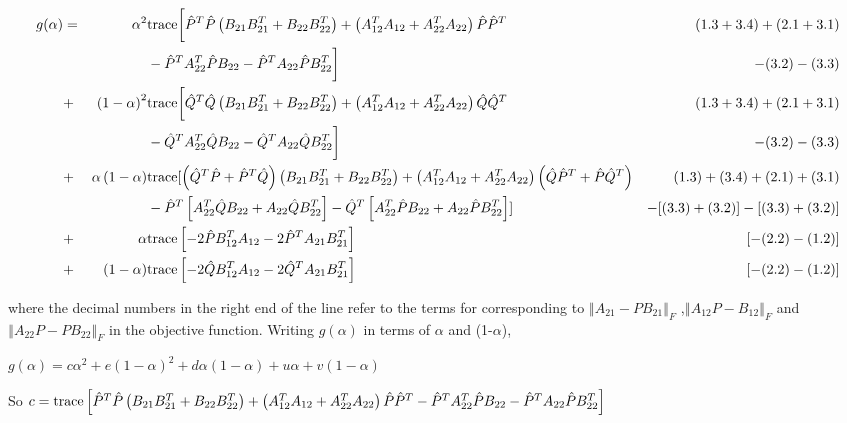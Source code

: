\documentclass[12pt,oneside,final]{thesis}\usepackage[]{graphicx}\usepackage[]{color}
\begin{document}
\begin{flushleft}
\begin{align*}
g(\alpha) & = & \alpha^{2} & \textup{trace}\biggl[\hat{P}^{T}\hat{P}\left(B_{21}B_{21}^{T}+B_{22}B_{22}^{T}\right)+\left(A_{12}^{T}A_{12}+A_{22}^{T}A_{22}\right)\hat{P}\hat{P}^{T} & (1.3+3.4)+(2.1+3.1)\\
 &  &  & -\hat{P}^{T}A_{22}^{T}\hat{P}B_{22}-\hat{P}^{T}A_{22}\hat{P}B_{22}^{T}\biggr] & -(3.2)-(3.3)\\
 & + & \left(1-\alpha\right)^{2} & \textup{trace}\biggl[\hat{Q}^{T}\hat{Q}\left(B_{21}B_{21}^{T}+B_{22}B_{22}^{T}\right)+\left(A_{12}^{T}A_{12}+A_{22}^{T}A_{22}\right)\hat{Q}\hat{Q}^{T} & (1.3+3.4)+(2.1+3.1)\\
 &  &  & -\hat{Q}^{T}A_{22}^{T}\hat{Q}B_{22}-\hat{Q}^{T}A_{22}\hat{Q}B_{22}^{T}\biggr] & -(3.2)-(3.3)\\
 & + & \alpha\left(1-\alpha\right) & \textup{trace}[\left(\hat{Q}^{T}\hat{P}+\hat{P}^{T}\hat{Q}\right)\left(B_{21}B_{21}^{T}+B_{22}B_{22}^{T}\right)+\left(A_{12}^{T}A_{12}+A_{22}^{T}A_{22}\right)\left(\hat{Q}\hat{P}^{T}+\hat{P}\hat{Q}^{T}\right) & (1.3)+(3.4)+(2.1)+(3.1)\\
 &  &  & -\hat{P}^{T}\left[A_{22}^{T}\hat{Q}B_{22}+A_{22}\hat{Q}B_{22}^{T}\right]-\hat{Q}^{T}\left[A_{22}^{T}\hat{P}B_{22}+A_{22}\hat{P}B_{22}^{T}\right]] & -[(3.3)+(3.2)]-[(3.3)+(3.2)]\\
 & + & \alpha & \textup{trace}\left[-2\hat{P}B_{12}^{T}A_{12}-2\hat{P}^{T}A_{21}B_{21}^{T}\right] & [-(2.2)-(1.2)]\\
 & + & \left(1-\alpha\right) & \textup{trace}\left[-2\hat{Q}B_{12}^{T}A_{12}-2\hat{Q}^{T}A_{21}B_{21}^{T}\right] & [-(2.2)-(1.2)]
\end{align*}

\par\end{flushleft}

where the decimal numbers in the right end of the line refer to the
terms for corresponding to $\left\Vert A_{21}-PB_{21}\right\Vert _{F}$
,$\left\Vert A_{12}P-B_{12}\right\Vert _{F}$ and $\left\Vert A_{22}P-PB_{22}\right\Vert _{F}$
in the objective function. Writing $g\left(\alpha\right)$ in terms
of $\alpha$ and (1-$\alpha$),

$g\left(\alpha\right)=c\alpha^{2}+e(1-\alpha)^{2}+d\alpha(1-\alpha)+u\alpha+v(1-\alpha)$

So $c=\textup{trace}\left[\hat{P}^{T}\hat{P}\left(B_{21}B_{21}^{T}+B_{22}B_{22}^{T}\right)+\left(A_{12}^{T}A_{12}+A_{22}^{T}A_{22}\right)\hat{P}\hat{P}^{T}-\hat{P}^{T}A_{22}^{T}\hat{P}B_{22}-\hat{P}^{T}A_{22}\hat{P}B_{22}^{T}\right]$
\end{document}
